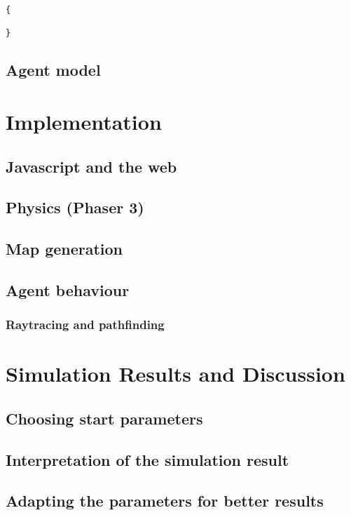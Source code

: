 \documentclass[11pt]{article}
\begin{document}
\begin{lstlisting}
{

}
\end{lstlisting}

\subsection{Agent model}

\section{Implementation}

\subsection{Javascript and the web}

\subsection{Physics (Phaser 3)}

\subsection{Map generation}

\subsection{Agent behaviour}

\subsubsection{Raytracing and pathfinding}

\section{Simulation Results and Discussion}

\subsection{Choosing start parameters}

\subsection{Interpretation of the simulation result}

\subsection{Adapting the parameters for better results}
\end{document}
